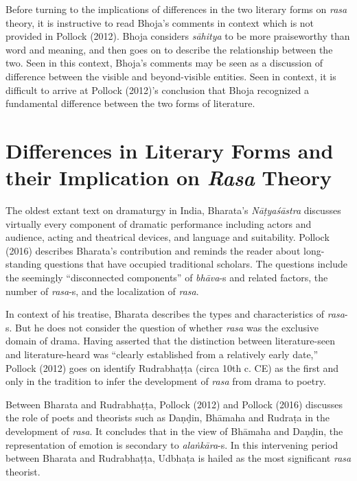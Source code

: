 Before turning to the implications of differences in the two literary forms on \textsl{rasa} theory, it is instructive to read Bhoja’s comments in context which is not provided in Pollock (2012). Bhoja considers \textsl{sāhitya} to be more praiseworthy than word and meaning, and then goes on to describe the relationship between the two. Seen in this context, Bhoja’s comments may be seen as a discussion of difference between the visible and beyond-visible entities. Seen in context, it is difficult to arrive at Pollock (2012)’s conclusion that Bhoja
 recognized a fundamental difference between the two forms of literature.

\section*{Differences in Literary Forms and their Implication on \textsl{Rasa} Theory}

The oldest extant text on dramaturgy in India, Bharata’s \textsl{Nāṭyaśāstra} discusses virtually every component of dramatic performance including actors and audience, acting and theatrical devices, and language and suitability. Pollock (2016) describes Bharata’s contribution and reminds the reader about long-standing questions that have occupied traditional scholars. The questions include the seemingly “disconne\-cted components” of \textsl{bhāva}-s and related factors, the number of \textsl{rasa}-s, and the localization of \textsl{rasa}.

In context of his treatise, Bharata describes the types and characteristics of \textsl{rasa}-s. But he does not consider the question of whether \textsl{rasa} was the exclusive domain of drama. Having asserted that the distinction between literature-seen and literature-heard was “clearly established from a relatively early date,” Pollock (2012) goes on identify Rudrabhaṭṭa (circa 10th c. CE) as the first and only in the tradition to infer the development of \textsl{rasa} from drama to poetry. 

Between Bharata and Rudrabhaṭṭa, Pollock (2012) and Pollock (2016) discusses the role of poets and theorists such as Daṇḍin, Bhāmaha and Rudraṭa in the development of \textsl{rasa}. It concludes that in the view of Bhāmaha and Daṇḍin, the representation of emotion is secondary to \textsl{alaṅkāra}-s. In this intervening period between Bharata and Rudrabhaṭṭa, Udbhaṭa is hailed as the most significant \textsl{rasa} theorist. 

